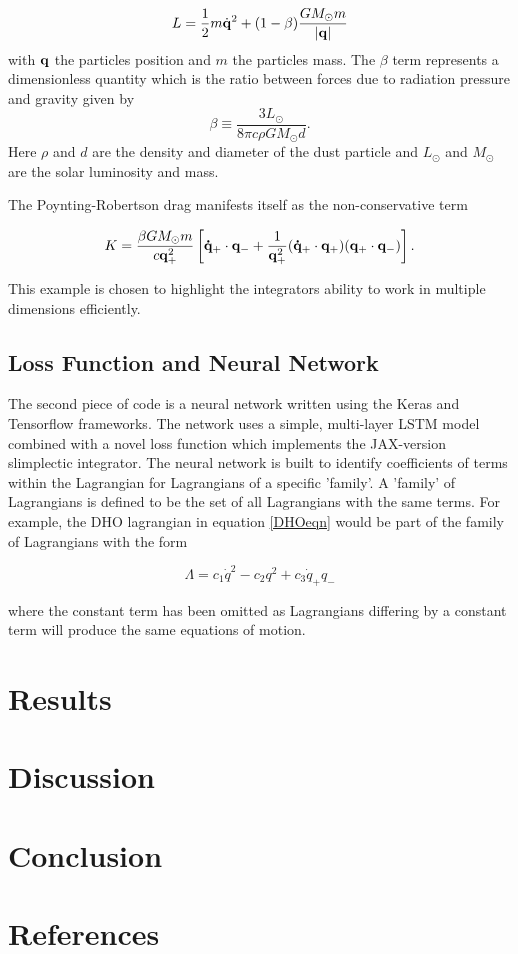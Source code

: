 \documentclass[10pt]{iopart}
\begin{document}
\begin{equation}
	L = \frac{1}{2}m\dot{\bold{q}}^2 + (1-\beta)\frac{GM_\odot m}{|\bold{q}|}
\end{equation} 
with $\bold{q}$ the particles position and $m$ the particles mass. The $\beta$ term represents a dimensionless quantity which is the ratio between forces due to radiation pressure and gravity given by 
\begin{equation}
	\beta\equiv\frac{3L_\odot}{8\pi c\rho GM_\odot d}.
\end{equation}
Here $\rho$ and $d$ are the density and diameter of the dust particle and $L_\odot$ and $M_\odot$ are the solar luminosity and mass.

The Poynting-Robertson drag manifests itself as the non-conservative term

\begin{equation}
	K = \frac{\beta GM_\odot m}{c\bold{q}_+^2}\left[\bold{\dot{q}}_+\cdot \bold{q}_- + \frac{1}{\bold{q}_+^2}(\bold{\dot{q}}_+\cdot\bold{q}_+)(\bold{q}_+\cdot\bold{q}_-)\right].
\end{equation}

This example is chosen to highlight the integrators ability to work in multiple dimensions efficiently. 

\subsection{Loss Function and Neural Network}
The second piece of code is a neural network written using the Keras \cite{Keras} and Tensorflow \cite{TF} frameworks. The network uses a simple, multi-layer LSTM model \cite{LSTM} combined with a novel loss function which implements the JAX-version slimplectic integrator. The neural network is built to identify coefficients of terms within the Lagrangian for Lagrangians of a specific 'family'. A 'family' of Lagrangians is defined to be the set of all Lagrangians with the same terms. For example, the DHO lagrangian in equation \ref{DHOeqn} would be part of the family of Lagrangians with the form 

\begin{equation}
	\label{DHOFamily}
	\Lambda = c_1\dot{q}^2 - c_2q^2 + c_3\dot{q}_+q_-
\end{equation}

where the constant term has been omitted as Lagrangians differing by a constant term will produce the same equations of motion. 

\section{Results}
\lipsum
\section{Discussion}
\lipsum
\section{Conclusion}
\ack
\section*{References}


\end{document}

